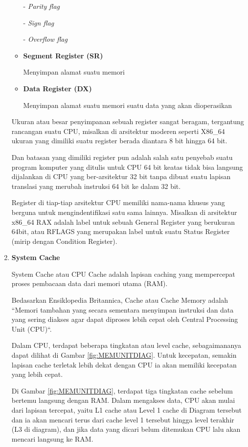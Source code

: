 \begin{enumerate}
\begin{itemize}
        - \textit{Parity flag}

        - \textit{Sign flag}

        - \textit{Overflow flag}

      \item \textbf{Segment Register (SR)}

        Menyimpan alamat suatu memori

      \item \textbf{Data Register (DX)}

        Menyimpan alamat suatu memori suatu data yang akan dioperasikan

    \end{itemize}

    Ukuran atau besar penyimpanan sebuah register sangat beragam, tergantung
    rancangan suatu CPU, misalkan di arsitektur moderen seperti X86\_64 ukuran
    yang dimiliki suatu register berada diantara 8 bit hingga 64 bit.

    Dan batasan yang dimiliki register pun adalah salah satu penyebab suatu
    program komputer yang ditulis untuk CPU 64 bit keatas tidak bisa langsung
    dijalankan di CPU yang ber-arsitektur 32 bit tanpa dibuat suatu lapisan
    translasi yang merubah instruksi 64 bit ke dalam 32 bit.

    Register di tiap-tiap arsitektur CPU memiliki nama-nama khusus yang berguna
    untuk mengindentifikasi satu sama lainnya. Misalkan di arsitektur x86\_64
    RAX adalah label untuk sebuah General Register yang berukuran 64bit, atau
    RFLAGS yang merupakan label untuk suatu Status Register (mirip dengan Condition Register).

  \item \textbf{System Cache}

    System Cache atau CPU Cache adalah lapisan caching yang mempercepat proses
    pembacaan data dari memori utama (RAM).

    Bedasarkan Ensiklopedia Britannica, Cache atau Cache Memory adalah
    ``Memori tambahan yang secara sementara menyimpan instruksi dan data yang
    sering diakses agar dapat diproses lebih cepat oleh Central Processing Unit
    (CPU)``.

    Dalam CPU, terdapat beberapa tingkatan atau level cache, sebagaimananya dapat
    dilihat di Gambar \ref{fig:MEMUNITDIAG}. Untuk kecepatan, semakin lapisan cache
    terletak lebih dekat dengan CPU ia akan memiliki kecepatan yang lebih cepat.

    Di Gambar \ref{fig:MEMUNITDIAG}, terdapat tiga tingkatan cache sebelum
    bertemu langsung dengan RAM. Dalam mengakses data, CPU akan mulai dari lapisan tercepat,
    yaitu L1 cache atau Level 1 cache di Diagram tersebut dan ia akan mencari terus
    dari cache level 1 tersebut hingga level terakhir (L3 di diagram), dan jika data yang
    dicari belum ditemukan CPU lalu akan mencari langsung ke RAM.


\end{enumerate}
